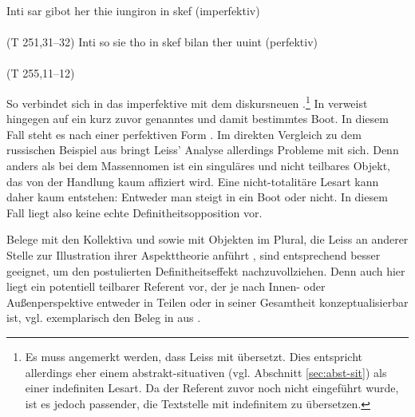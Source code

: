 \begin{exe}
	\ex \label{ex:gi-stigan}   
	\begin{xlist}
		\ex \label{ex:stigan} Inti sar gibot her thie iungiron  in skef  \hfill (imperfektiv) \\ 
		 \\ (T 251,31--32)
		\ex \label{ex:gistigan} Inti so sie tho  in skef bilan ther uuint \hfill (perfektiv) \\   \\ (T 255,11--12)
		\end{xlist}
\end{exe}
\noindent
So verbindet sich in  das imperfektive    mit dem diskursneuen .\footnote{Es muss angemerkt werden, dass Leiss  mit  übersetzt. Dies entspricht allerdings eher einem abstrakt-situativen   (vgl. Abschnitt \ref{sec:abst-sit}) als einer indefiniten  Lesart. Da der Referent zuvor noch nicht eingeführt wurde, ist es jedoch passender, die Textstelle mit indefinitem  zu übersetzen.} In  verweist  hingegen auf ein kurz zuvor genanntes und damit bestimmtes Boot. In diesem Fall steht es nach einer perfektiven  Form .
Im direkten Vergleich zu dem russischen Beispiel aus  bringt Leiss' Analyse allerdings Probleme mit sich. Denn anders als bei dem Massennomen   ist  ein singuläres und nicht teilbares Objekt, das von der Handlung  kaum affiziert wird. Eine nicht-totalitäre Lesart kann daher kaum entstehen: Entweder man steigt in ein Boot oder nicht. In diesem Fall liegt also keine echte Definitheitsopposition  vor. 

Belege mit den Kollektiva    und   sowie mit Objekten  im Plural, die Leiss an anderer Stelle zur Illustration ihrer Aspekttheorie  anführt \parencite[170--174]{Leiss2000}, sind entsprechend besser geeignet, um den postulierten Definitheitseffekt  nachzuvollziehen. Denn auch hier liegt ein potentiell teilbarer Referent vor, der je nach Innen- oder Außenperspektive entweder in Teilen oder in seiner Gesamtheit konzeptualisierbar ist, vgl. exemplarisch den Beleg in  aus \textcite[170]{Leiss2000}. 


